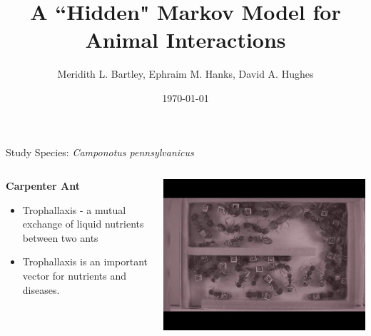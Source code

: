 \documentclass[10pt]{beamer}
\title{A ``Hidden" Markov Model for Animal Interactions}
\subtitle{}
\date{\today}
\author{Meridith L. Bartley, Ephraim M. Hanks, David A. Hughes}
\institute{Pennsylvania State University\\
\\
Funding Source: NSF EEID 1414296}
\begin{document}
\maketitle



\begin{frame}[fragile]{Study Species: \it{Camponotus pennsylvanicus}}

 \begin{columns}[T]
    \begin{column}{.4\textwidth}
     \begin{block}{}
     \textbf{Carpenter Ant}
\begin{itemize}
\item Trophallaxis - a mutual exchange of liquid nutrients between two ants
\item Trophallaxis is an important vector for nutrients and diseases. 
\end{itemize}

\end{block}
    \end{column}


\begin{column}{.6\textwidth}
    \begin{block}{}
    \includegraphics[width=\textwidth]{troph.jpg}


    \end{block}
    \end{column}
  \end{columns}
  
 

\end{frame}
\end{document}
